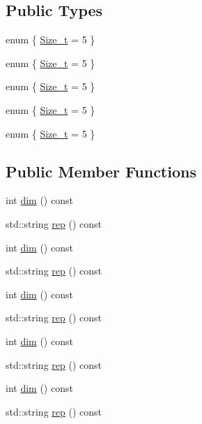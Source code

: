 \subsection*{Public Types}
\begin{DoxyCompactItemize}
\item 
enum \{ \mbox{\hyperlink{structHadron_1_1J2Rep_ac86899cf04fc2f1df36152f855ab700baf373966e0fdf5720e95e95a61443a265}{Size\+\_\+t}} = 5
 \}
\item 
enum \{ \mbox{\hyperlink{structHadron_1_1J2Rep_ac86899cf04fc2f1df36152f855ab700baf373966e0fdf5720e95e95a61443a265}{Size\+\_\+t}} = 5
 \}
\item 
enum \{ \mbox{\hyperlink{structHadron_1_1J2Rep_ac86899cf04fc2f1df36152f855ab700baf373966e0fdf5720e95e95a61443a265}{Size\+\_\+t}} = 5
 \}
\item 
enum \{ \mbox{\hyperlink{structHadron_1_1J2Rep_ac86899cf04fc2f1df36152f855ab700baf373966e0fdf5720e95e95a61443a265}{Size\+\_\+t}} = 5
 \}
\item 
enum \{ \mbox{\hyperlink{structHadron_1_1J2Rep_ac86899cf04fc2f1df36152f855ab700baf373966e0fdf5720e95e95a61443a265}{Size\+\_\+t}} = 5
 \}
\end{DoxyCompactItemize}
\subsection*{Public Member Functions}
\begin{DoxyCompactItemize}
\item 
int \mbox{\hyperlink{structHadron_1_1J2Rep_a9bbfe6d82db1e96beda068411ff79371}{dim}} () const
\item 
std\+::string \mbox{\hyperlink{structHadron_1_1J2Rep_ae377be8f84efb218c8a07db0d4d5bb01}{rep}} () const
\item 
int \mbox{\hyperlink{structHadron_1_1J2Rep_a9bbfe6d82db1e96beda068411ff79371}{dim}} () const
\item 
std\+::string \mbox{\hyperlink{structHadron_1_1J2Rep_ae377be8f84efb218c8a07db0d4d5bb01}{rep}} () const
\item 
int \mbox{\hyperlink{structHadron_1_1J2Rep_a9bbfe6d82db1e96beda068411ff79371}{dim}} () const
\item 
std\+::string \mbox{\hyperlink{structHadron_1_1J2Rep_ae377be8f84efb218c8a07db0d4d5bb01}{rep}} () const
\item 
int \mbox{\hyperlink{structHadron_1_1J2Rep_a9bbfe6d82db1e96beda068411ff79371}{dim}} () const
\item 
std\+::string \mbox{\hyperlink{structHadron_1_1J2Rep_ae377be8f84efb218c8a07db0d4d5bb01}{rep}} () const
\item 
int \mbox{\hyperlink{structHadron_1_1J2Rep_a9bbfe6d82db1e96beda068411ff79371}{dim}} () const
\item 
std\+::string \mbox{\hyperlink{structHadron_1_1J2Rep_ae377be8f84efb218c8a07db0d4d5bb01}{rep}} () const
\end{DoxyCompactItemize}


